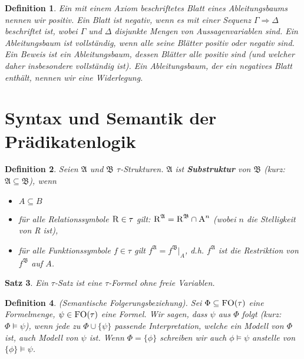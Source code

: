 \documentclass[12pt,a4paper]{article}
\newtheorem{defi}{Definition}[section]
\newtheorem{satz}[defi]{Satz}
\begin{document}
	\begin{defi}
	Ein mit einem Axiom beschriftetes Blatt eines Ableitungsbaums
nennen wir positiv. Ein Blatt ist negativ, wenn es mit einer Sequenz
$\Gamma \Rightarrow \Delta$ beschriftet ist, wobei $\Gamma$ und $\Delta$ disjunkte Mengen von Aussagenvariablen sind. Ein Ableitungsbaum ist vollständig, wenn alle seine
Blätter positiv oder negativ sind.\\
		Ein Beweis ist ein Ableitungsbaum, dessen Blätter alle
positiv sind (und welcher daher insbesondere vollständig ist). Ein
Ableitungsbaum, der ein negatives Blatt enthält, nennen wir eine Widerlegung.
	\end{defi}
	
\section{Syntax und Semantik der Prädikatenlogik}
	\begin{defi}
		Seien $\mathfrak{A}$ und $\mathfrak{B}$ $\tau$-Strukturen. $\mathfrak{A}$ ist \textbf{Substruktur} von $\mathfrak{B}$ (kurz: $\mathfrak{A}\subseteq\mathfrak{B}$), wenn
		\begin{itemize}
			\item $A\subseteq B$
			\item für alle Relationssymbole $\textsc{R}\in\tau$ gilt: $\textsc{R}^\mathfrak{A}=\textsc{R}^\mathfrak{B}\cap\textsc{A}^n$ (wobei $n$ die Stelligkeit von \textsc{R} ist),
			\item für alle Funktionssymbole $f\in\tau$ gilt $f^\mathfrak{A}=f^\mathfrak{B}|_A$, d.h. $f^\mathfrak{A}$ ist die Restriktion von $f^\mathfrak{B}$ auf $A$.
		\end{itemize}
	\end{defi}
	\begin{satz}
		Ein $\tau$-Satz ist eine $\tau$-Formel ohne freie Variablen.
	\end{satz}
	\begin{defi}
		(Semantische Folgerungsbeziehung). Sei $\Phi\subseteq\textsc{FO}(\tau)$ eine Formelmenge, $\psi\in\textsc{FO}(\tau)$ eine Formel. Wir sagen, dass $\psi$ aus $\Phi$ folgt (kurz: $\Phi\models\psi$), wenn jede zu $\Phi\cup\lbrace\psi\rbrace$ passende Interpretation, welche ein Modell von $\Phi$ ist, auch Modell von $\psi$ ist. Wenn $\Phi=\lbrace\phi\rbrace$ schreiben wir auch $\phi\models\psi$ anstelle von $\lbrace\phi\rbrace\models\psi$.
	\end{defi}
\end{document}
